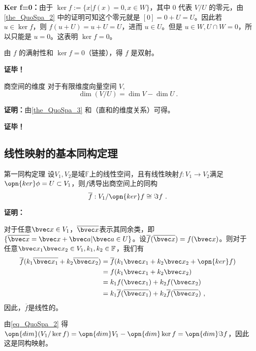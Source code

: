 \textbf{Ker f=0：}由于 $\ker f:=\{x|f(x)=0,x\in W\}$，其中 $0$ 代表 $V/U$ 的零元，由\autoref{the_QuoSpa_2} 中的证明可知这个零元就是 $[0]=0+U=U$。因此若 $u\in\ker f$，则 $f(u+U)=u+U=U$，进而 $u\in U$。但是 $u\in W,U\cap W=0$，所以只能是 $u=0$。这表明 $\ker f=0$。

由 $f$ 的满射性和 $\ker f=0$（链接），得 $f$ 是双射。

\textbf{证毕！}

\begin{corollary}{商空间的维度}
对于有限维度向量空间 $V$,
\begin{equation}\label{eq_QuoSpa_2}
\dim(V/U) = \dim V - \dim U~.
\end{equation}
\end{corollary}

\textbf{证明：}由\autoref{the_QuoSpa_3} 和（直和的维度关系）可得。

\textbf{证毕！}
\subsection{线性映射的基本同构定理}
\begin{theorem}{第一同构定理}
设$V_1,V_2$是域$\mathbb F$上的线性空间，且有线性映射$f:V_1\rightarrow V_2$满足$\opn{ker}\phi=U\subset V_1$，则$f$诱导出商空间上的同构
\begin{equation}
\overline f:V_1/\opn{ker}f \cong  \Im f~.
\end{equation}
\end{theorem}
\textbf{证明：}

对于任意$\bvec x\in V_1$，$\overline {\bvec x}$表示其同余类，即$\{\overline {\bvec x}=\bvec x+\bvec a|\bvec a\in U\}$。设$\overline f(\overline {\bvec x})=f(\bvec x)$。则对于任意$\bvec x_1\bvec x_2\in V_1,k_1,k_2\in \mathbb F$，我们有
\begin{equation}\label{eq_QuoSpa_3}
\begin{aligned}
\overline f(k_1 \overline {\bvec x_1}+k_2\overline {\bvec x_2})&=\overline f(k_1\bvec x_1+k_2\bvec x_2+\opn{ker}f)\\
&=f(k_1\bvec x_1+k_2\bvec x_2)\\
&=k_1f(\bvec x_1)+k_2f(\bvec x_2)\\
&=k_1\overline f(\overline {\bvec x_1})+k_2\overline f(\overline {\bvec x_2})~,
\end{aligned}
\end{equation}
因此，$\overline f$是线性的。

由\autoref{eq_QuoSpa_2} 得$\opn{dim}(V_1/\ker f)=\opn{dim}V_1-\opn{dim}\ker f=\opn{dim}\Im f$，因此这是同构映射。


